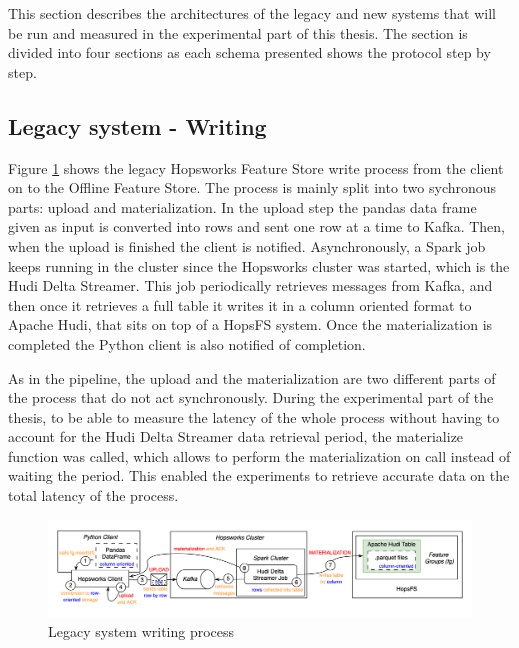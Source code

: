 This section describes the architectures of the legacy and new systems that will be run and measured in the experimental part of this thesis. The section is divided into four sections as each schema presented shows the protocol step by step.

\subsection{Legacy system - Writing}
\label{subsec:legacy_sys_writing}

Figure \ref{fig:featurestore_writing} shows the legacy Hopsworks Feature Store write process from the client on to the Offline Feature Store. The process is mainly split into two sychronous parts: upload and materialization. In the upload step the pandas data frame given as input is converted into rows and sent one row at a time to Kafka. Then, when the upload is finished the client is notified. Asynchronously, a Spark job keeps running in the cluster since the Hopsworks cluster was started, which is the Hudi Delta Streamer. This job periodically retrieves messages from Kafka, and then once it retrieves a full table it writes it in a column oriented format to Apache Hudi, that sits on top of a \gls{HopsFS} system. Once the materialization is completed the Python client is also notified of completion.

As in the pipeline, the upload and the materialization are two different parts of the process that do not act synchronously. During the experimental part of the thesis, to be able to measure the latency of the whole process without having to account for the Hudi Delta Streamer data retrieval period, the materialize function was called, which allows to perform the materialization on call instead of waiting the period. This enabled the experiments to retrieve accurate data on the total latency of the process.


\begin{figure}
    \begin{center}
      \includegraphics[width=\textwidth]{figures/2-background/FeatureStore-writing.png}
    \end{center}
    \caption{Legacy system writing process}
    \label{fig:featurestore_writing}
\end{figure}

